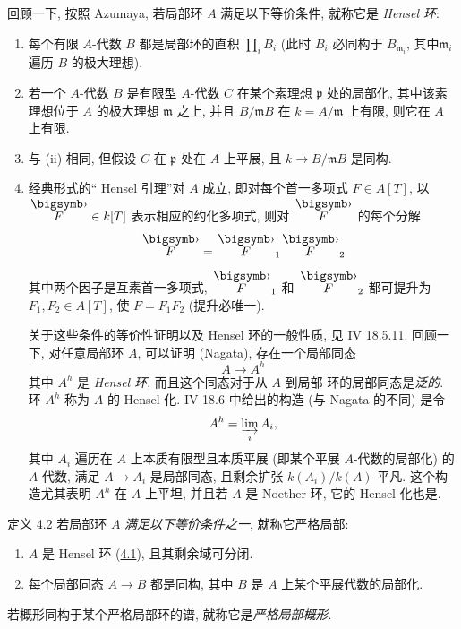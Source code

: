 回顾一下, 按照 Azumaya,
若局部环 $A$ 满足以下等价条件, 就称它是 \emph{Hensel 环}:
\begin{enumerate}
\renewcommand{\theenumi}{\roman{enumi}}
\renewcommand{\labelenumi}{(\theenumi)}
\item 每个有限 $A$-代数 $B$ 都是局部环的直积 $\prod_i B_i$
(此时 $B_i$ 必同构于 $B_{\mathfrak m_i}$,
其中\pageoriginale $\mathfrak m_i$ 遍历 $B$ 的极大理想).

\item 若一个 $A$-代数 $B$ 是有限型 $A$-代数 $C$ 在某个素理想 $\mathfrak p$
处的局部化, 其中该素理想位于 $A$ 的极大理想 $\mathfrak m$ 之上,
并且 $B/\mathfrak mB$ 在 $k=A/\mathfrak m$ 上有限,
则它在 $A$ 上有限.

\item 与 (ii) 相同, 但假设 $C$ 在 $\mathfrak p$ 处在 $A$ 上平展,
且 $k\to B/\mathfrak mB$ 是同构.

\item 经典形式的“ Hensel 引理”对 $A$ 成立,
即对每个首一多项式 $F\in A[T]$,
以 $\overset{\bigdot}{F}\in k[T]$ 表示相应的约化多项式,
则对 $\overset{\bigdot}{F}$ 的每个分解
$$
\overset{\bigdot}{F}
=\overset{\bigdot}{F}_1\overset{\bigdot}{F}_2
$$
其中两个因子是互素首一多项式,
$\overset{\bigdot}{F}_1$ 和 $\overset{\bigdot}{F}_2$
都可提升为 $F_1,F_2\in A[T]$, 使 $F=F_1F_2$ (提升必唯一).

关于这些条件的等价性证明以及 Hensel 环的一般性质, 见 \EGA IV 18.5.11.
回顾一下, 对任意局部环 $A$, 可以证明 (Nagata), 存在一个局部同态
$$
A\to A^h
$$
其中 $A^h$ 是 \emph{Hensel 环},
而且这个同态对于从 $A$ 到局部  环的局部同态是\emph{泛的}.
环 $A^h$ 称为 $A$ 的 Hensel 化.
\EGA IV 18.6 中给出的构造 (与 Nagata 的不同) 是令
$$
A^h=\varinjlim_i A_i{},
$$
其中 $A_i$ 遍历在 $A$ 上本质有限型且本质平展\pageoriginale
(即某个平展 $A$-代数的局部化) 的 $A$-代数,
满足 $A\to A_i$ 是局部同态, 且剩余扩张 $k(A_i)/k(A)$ 平凡.
这个构造尤其表明 $A^h$ 在 $A$ 上平坦,
并且若 $A$ 是 Noether 环, 它的 Hensel 化也是.
\end{enumerate}

\begin{enonce*}{定义 4.2}
若局部环 $A$ \emph{满足以下等价条件之一}, 就称它严格局部:
\begin{enumerate}
\renewcommand{\theenumi}{\roman{enumi}}
\renewcommand{\labelenumi}{(\theenumi)}
\item $A$ 是 Hensel 环 (\hyperref[VIII.subsec4.1]{4.1}),
且其剩余域可分闭.

\item 每个局部同态 $A\to B$ 都是同构,
其中 $B$ 是 $A$ 上某个平展代数的局部化.
\end{enumerate}

若概形同构于某个严格局部环的谱, 就称它是\emph{严格局部概形}.
\end{enonce*}

